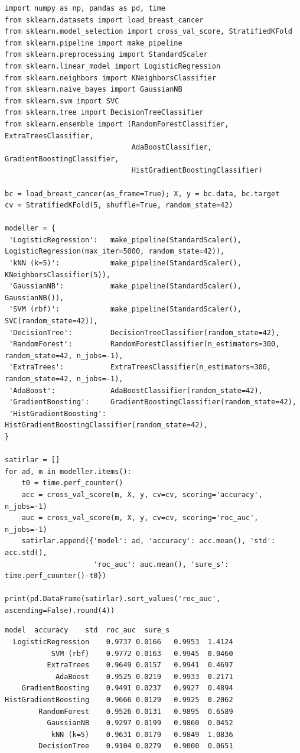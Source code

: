 \documentclass[11pt,a4paper]{article}
\begin{document}
\begin{lstlisting}
import numpy as np, pandas as pd, time
from sklearn.datasets import load_breast_cancer
from sklearn.model_selection import cross_val_score, StratifiedKFold
from sklearn.pipeline import make_pipeline
from sklearn.preprocessing import StandardScaler
from sklearn.linear_model import LogisticRegression
from sklearn.neighbors import KNeighborsClassifier
from sklearn.naive_bayes import GaussianNB
from sklearn.svm import SVC
from sklearn.tree import DecisionTreeClassifier
from sklearn.ensemble import (RandomForestClassifier, ExtraTreesClassifier,
                              AdaBoostClassifier, GradientBoostingClassifier,
                              HistGradientBoostingClassifier)

bc = load_breast_cancer(as_frame=True); X, y = bc.data, bc.target
cv = StratifiedKFold(5, shuffle=True, random_state=42)

modeller = {
 'LogisticRegression':   make_pipeline(StandardScaler(), LogisticRegression(max_iter=5000, random_state=42)),
 'kNN (k=5)':            make_pipeline(StandardScaler(), KNeighborsClassifier(5)),
 'GaussianNB':           make_pipeline(StandardScaler(), GaussianNB()),
 'SVM (rbf)':            make_pipeline(StandardScaler(), SVC(random_state=42)),
 'DecisionTree':         DecisionTreeClassifier(random_state=42),
 'RandomForest':         RandomForestClassifier(n_estimators=300, random_state=42, n_jobs=-1),
 'ExtraTrees':           ExtraTreesClassifier(n_estimators=300, random_state=42, n_jobs=-1),
 'AdaBoost':             AdaBoostClassifier(random_state=42),
 'GradientBoosting':     GradientBoostingClassifier(random_state=42),
 'HistGradientBoosting': HistGradientBoostingClassifier(random_state=42),
}

satirlar = []
for ad, m in modeller.items():
    t0 = time.perf_counter()
    acc = cross_val_score(m, X, y, cv=cv, scoring='accuracy', n_jobs=-1)
    auc = cross_val_score(m, X, y, cv=cv, scoring='roc_auc',  n_jobs=-1)
    satirlar.append({'model': ad, 'accuracy': acc.mean(), 'std': acc.std(),
                     'roc_auc': auc.mean(), 'sure_s': time.perf_counter()-t0})

print(pd.DataFrame(satirlar).sort_values('roc_auc', ascending=False).round(4))
\end{lstlisting}

\begin{lstlisting}[style=outstyle]
               model  accuracy    std  roc_auc  sure_s
  LogisticRegression    0.9737 0.0166   0.9953  1.4124
           SVM (rbf)    0.9772 0.0163   0.9945  0.0460
          ExtraTrees    0.9649 0.0157   0.9941  0.4697
            AdaBoost    0.9525 0.0219   0.9933  0.2171
    GradientBoosting    0.9491 0.0237   0.9927  0.4894
HistGradientBoosting    0.9666 0.0129   0.9925  0.2062
        RandomForest    0.9526 0.0131   0.9895  0.6589
          GaussianNB    0.9297 0.0199   0.9860  0.0452
           kNN (k=5)    0.9631 0.0179   0.9849  1.0836
        DecisionTree    0.9104 0.0279   0.9000  0.0651
\end{lstlisting}
\end{document}

